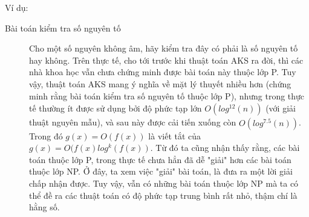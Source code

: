 \documentclass[a4paper 14pt]{article}
\begin{document}
			Ví dụ:\\
			\begin{description}
				\item[Bài toán kiểm tra số nguyên tố] Cho một số nguyên không âm, hãy kiểm tra đây có phải là số nguyên tố hay không. Trên thực tế, cho tới trước khi thuật toán AKS ra đời, thì các nhà khoa học vẫn chưa chứng minh được bài toán này thuộc lớp P. Tuy vậy, thuật toán AKS mang ý nghĩa về mặt lý thuyết nhiều hơn (chứng minh rằng bài toán kiểm tra số nguyên tố thuộc lớp P), nhưng trong thực tế thường ít được sử dụng bởi độ phức tạp lớn $\overset{~}{O(log^{12}(n))}$ (với giải thuật nguyên mẫu), và sau này được cải tiến xuống còn $\overset{~}{O(log^{7.5}(n))}$. Trong đó $g(x) = \overset{~}{O(f(x))}$ là viết tắt của $g(x) = O(f(x)log^k(f(x))$. Từ đó ta cũng nhận thấy rằng, các bài toán thuộc lớp P, trong thực tế chưa hẳn đã dễ "giải" hơn các bài toán thuộc lớp NP. Ở đây, ta xem việc "giải" bài toán, là đưa ra một lời giải chấp nhận được. Tuy vậy, vẫn có những bài toán thuộc lớp NP mà ta có thể đề ra các thuật toán có độ phức tạp trung bình rất nhỏ, thậm chí là hằng số.
			\end{description}
\end{document}
